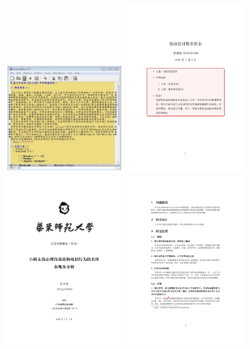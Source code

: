 \documentclass[a4paper, 12pt, oneside]{article}
\begin{document}
    \begin{tcolorbox}[enhanced,attach boxed title to top center={yshift=-3mm,yshifttext=-1mm},
  colback=yellow!10!white,colframe=yellow,colbacktitle=red!80!black,
  title={2018.2 开始学习 \LaTeX},fonttitle=\bfseries, fontupper=\CTEXindent,
  boxed title style={size=small,colframe=red!50!black}]
    
    \vfill
    \centering
    \href{https://www.overleaf.com/read/qtfstkjcmfnq}{\includegraphics[height=0.4\textwidth, width=0.4\textwidth]{works/koran.pdf}}
    \href{https://www.overleaf.com/read/dbhrbgmkhrby}{\includegraphics[height=0.4\textwidth, width=0.4\textwidth]{works/2.pdf}}\\
    \href{https://www.overleaf.com/read/wkrdfcdnbbmk}{\includegraphics[height=0.4\textwidth, width=0.4\textwidth]{works/3.pdf}}
    \href{https://www.overleaf.com/read/qdphfqswdcxz}{\includegraphics[height=0.4\textwidth, width=0.4\textwidth]{works/4.pdf}}
    
    \end{tcolorbox}
    
\end{document}
